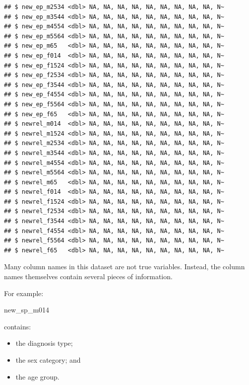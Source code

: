 \documentclass[
  11pt,
  oneside]{book}
\newenvironment{Shaded}{\begin{snugshade}}{\end{snugshade}}
\newcommand{\NormalTok}[1]{#1}
\providecommand{\tightlist}{%
  \setlength{\itemsep}{0pt}\setlength{\parskip}{0pt}}
\begin{document}
\begin{verbatim}
## $ new_ep_m2534 <dbl> NA, NA, NA, NA, NA, NA, NA, NA, NA, N~
## $ new_ep_m3544 <dbl> NA, NA, NA, NA, NA, NA, NA, NA, NA, N~
## $ new_ep_m4554 <dbl> NA, NA, NA, NA, NA, NA, NA, NA, NA, N~
## $ new_ep_m5564 <dbl> NA, NA, NA, NA, NA, NA, NA, NA, NA, N~
## $ new_ep_m65   <dbl> NA, NA, NA, NA, NA, NA, NA, NA, NA, N~
## $ new_ep_f014  <dbl> NA, NA, NA, NA, NA, NA, NA, NA, NA, N~
## $ new_ep_f1524 <dbl> NA, NA, NA, NA, NA, NA, NA, NA, NA, N~
## $ new_ep_f2534 <dbl> NA, NA, NA, NA, NA, NA, NA, NA, NA, N~
## $ new_ep_f3544 <dbl> NA, NA, NA, NA, NA, NA, NA, NA, NA, N~
## $ new_ep_f4554 <dbl> NA, NA, NA, NA, NA, NA, NA, NA, NA, N~
## $ new_ep_f5564 <dbl> NA, NA, NA, NA, NA, NA, NA, NA, NA, N~
## $ new_ep_f65   <dbl> NA, NA, NA, NA, NA, NA, NA, NA, NA, N~
## $ newrel_m014  <dbl> NA, NA, NA, NA, NA, NA, NA, NA, NA, N~
## $ newrel_m1524 <dbl> NA, NA, NA, NA, NA, NA, NA, NA, NA, N~
## $ newrel_m2534 <dbl> NA, NA, NA, NA, NA, NA, NA, NA, NA, N~
## $ newrel_m3544 <dbl> NA, NA, NA, NA, NA, NA, NA, NA, NA, N~
## $ newrel_m4554 <dbl> NA, NA, NA, NA, NA, NA, NA, NA, NA, N~
## $ newrel_m5564 <dbl> NA, NA, NA, NA, NA, NA, NA, NA, NA, N~
## $ newrel_m65   <dbl> NA, NA, NA, NA, NA, NA, NA, NA, NA, N~
## $ newrel_f014  <dbl> NA, NA, NA, NA, NA, NA, NA, NA, NA, N~
## $ newrel_f1524 <dbl> NA, NA, NA, NA, NA, NA, NA, NA, NA, N~
## $ newrel_f2534 <dbl> NA, NA, NA, NA, NA, NA, NA, NA, NA, N~
## $ newrel_f3544 <dbl> NA, NA, NA, NA, NA, NA, NA, NA, NA, N~
## $ newrel_f4554 <dbl> NA, NA, NA, NA, NA, NA, NA, NA, NA, N~
## $ newrel_f5564 <dbl> NA, NA, NA, NA, NA, NA, NA, NA, NA, N~
## $ newrel_f65   <dbl> NA, NA, NA, NA, NA, NA, NA, NA, NA, N~
\end{verbatim}

Many column names in this dataset are not true variables. Instead, the column names themselves contain several pieces of information.

For example:

\begin{Shaded}
\begin{Highlighting}[]
\NormalTok{new\_sp\_m014}
\end{Highlighting}
\end{Shaded}

contains:

\begin{itemize}
\tightlist
\item
  the diagnosis type;
\item
  the sex category; and
\item
  the age group.
\end{itemize}
\end{document}
